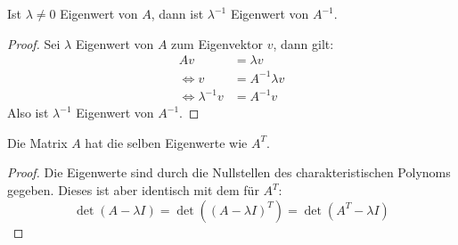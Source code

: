 \documentclass{mywork}
\begin{document}
\begin{lem*}
Ist $\lambda\neq 0$ Eigenwert von $A$, dann ist $\lambda^{-1}$ Eigenwert von $A^{-1}$.
\begin{proof}
Sei $\lambda$ Eigenwert von $A$ zum Eigenvektor $v$, dann gilt:
\begin{align*}
Av &= \lambda v\\
\iff v &= A^{-1}\lambda v\\
\iff \lambda^{-1}v &= A^{-1}v
\end{align*}
Also ist $\lambda^{-1}$ Eigenwert von $A^{-1}$.
\end{proof}
\end{lem*}
\begin{lem*}
Die Matrix $A$ hat die selben Eigenwerte wie $A^T$.
\begin{proof}
Die Eigenwerte sind durch die Nullstellen des charakteristischen Polynoms gegeben.
Dieses ist aber identisch mit dem für $A^T$:
\[
\det(A-\lambda I)=\det((A-\lambda I)^T)=\det(A^T-\lambda I)
\]
\end{proof}
\end{lem*}
\end{document}
